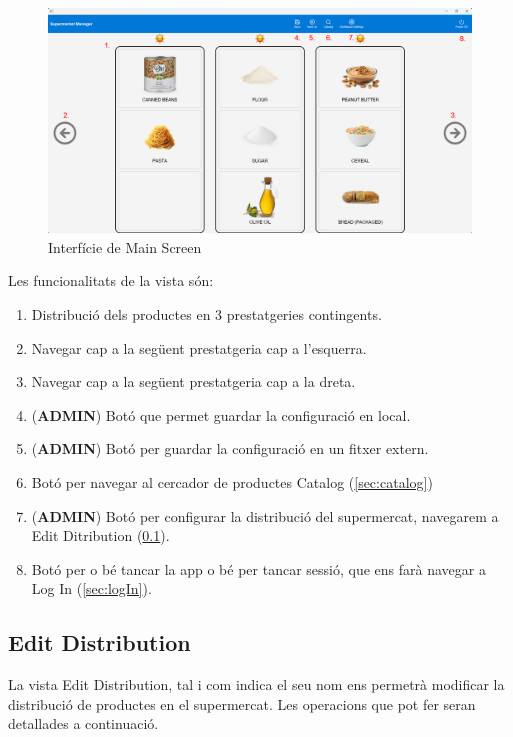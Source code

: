 \documentclass[a4paper,12pt]{article}
\begin{document}
	\begin{figure}[H] 
		\centering
		\includegraphics[width=0.75\linewidth]{assets/mainscreen.png}
		\caption{Interfície de Main Screen}
	\end{figure}
	
	\noindent Les funcionalitats de la vista són:
	
	\begin{enumerate}[itemsep=0pt, topsep=0pt]
		\item Distribució dels productes en 3 prestatgeries contingents.
		\item Navegar cap a la següent prestatgeria cap a l'esquerra.
		\item Navegar cap a la següent prestatgeria cap a la dreta.
		\item (\textbf{ADMIN}) Botó que permet guardar la configuració en local.
		\item (\textbf{ADMIN}) Botó per guardar la configuració en un fitxer extern.
		\item Botó per navegar al cercador de productes Catalog (\ref{sec:catalog})
		\item (\textbf{ADMIN}) Botó per configurar la distribució del supermercat, navegarem a Edit Ditribution (\ref{sec:editDistribution}).
		\item Botó per o bé tancar la app o bé per tancar sessió, que ens farà navegar a Log In (\ref{sec:logIn}).
	\end{enumerate}
	
	\newpage
	\subsection{Edit Distribution}
	\label{sec:editDistribution}
	
	La vista Edit Distribution, tal i com indica el seu nom ens permetrà modificar la distribució de productes en el supermercat. Les operacions que pot fer seran detallades a continuació. \\
	
\end{document}
